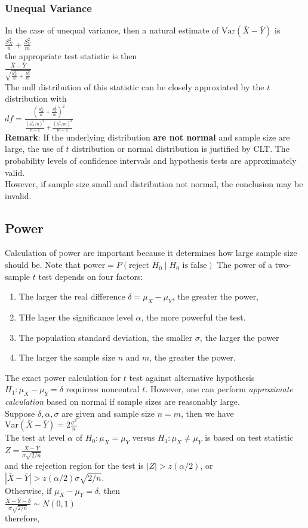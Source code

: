 \documentclass[12pt]{article}
\newcommand{\var}{\mathrm{Var}}
\theoremstyle{definition}
\begin{document}
\subsubsection{Unequal Variance}
In the case of unequal variance, then a natural estimate of $\var(\bar{X}-\bar{Y})$ is
$
\frac{S_X^2}{n}+\frac{S_Y^2}{m}
$\\
the appropriate test statistic is then\\
$
\frac{\bar{X}-\bar{Y}}{\sqrt{\frac{S_X^2}{n}+\frac{S_Y^2}{m}}}
$\\
The null distribution of this statistic can be closely approxiated by the $t$ distribution with \\
$
df=\frac{(\frac{S_X^2}{n}+\frac{S_Y^2}{m})^2}{\frac{(S_X^2/n)^2}{n-1}+\frac{(S_Y^2/m)^2}{m-1}}
$\\
\textbf{Remark}: If the underlying distribution \textbf{are not normal} and sample size are large, the use of $t$ distribution or normal distribution is justified by CLT. The probability levels of confidence intervals and hypothesis tests are approximately valid.\\
However, if sample size small and distribution not normal, the conclusion may be invalid.
\subsection{Power}
Calculation of power are important because it determines how large sample size should be. Note that
$
\text{power}=P(\text{reject }H_0\mid H_0\text{ is false})
$
The power of a two-sample $t$ test depends on four factors:
\begin{enumerate}
  \item The larger the real difference $\delta = \mu_X-\mu_Y$, the greater the power,
  \item THe lager the significance level $\alpha$, the more powerful the test.
  \item The population standard deviation, the smaller $\sigma$, the larger the power
  \item The larger the sample size $n$ and $m$, the greater the power.
\end{enumerate}
The exact power calculation for $t$ test against alternative hypothesis $H_1:\mu_X-\mu_Y=\delta$ requirees noncentral $t$. However, one can perform \textit{approximate calculation} based on normal if sample sizes are reasonably large.\\
Suppose $\delta, \alpha, \sigma$ are given and sample size $n=m$, then we have\\
$
\var(\bar{X}-\bar{Y})=2\frac{\sigma^2}{n}
$\\
The test at level $\alpha$ of $H_0:\mu_X=\mu_Y$ versus $H_1:\mu_X\neq \mu_Y$ is based on test statistic\\
$
Z=\frac{\bar{X}-\bar{Y}}{\sigma\sqrt{2/n}}
$\\
and the rejection region for the test is $|Z|>z(\alpha/2)$, or $|\bar{X}-\bar{Y}|>z(\alpha/2)\sigma\sqrt{2/n}$.\\
Otherwise, if $\mu_X-\mu_Y=\delta$, then\\
$
\frac{\bar{X}-\bar{Y}-\delta}{\sigma\sqrt{2/n}}\sim N(0,1)
$\\
therefore, 
\end{document}
